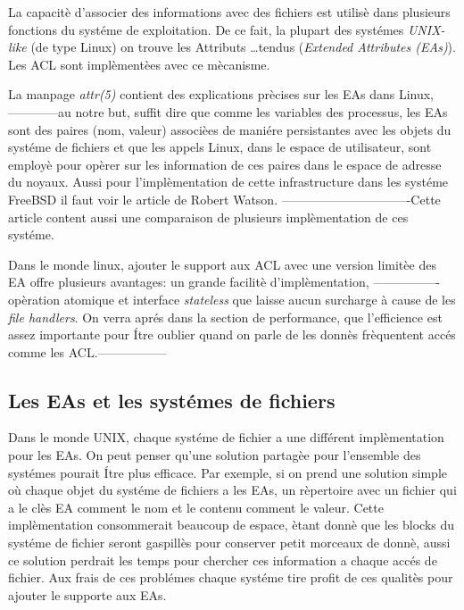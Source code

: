 La capacitè d'associer des informations avec des fichiers est utilisè dans plusieurs fonctions du systéme de exploitation. De ce fait, la plupart des systémes \emph{UNIX-like} (de type Linux) on trouve les Attributs …tendus (\emph{Extended Attributes (EAs)}). Les ACL sont implèmentèes avec ce mècanisme.

La manpage \cite{aclsuse} \emph{attr(5)} contient des explications prècises sur les EAs dans Linux, ------------au notre but, suffit dire que comme les variables des processus, les EAs sont des paires (nom, valeur) associèes de maniére persistantes avec les objets du systéme de fichiers et que les appels Linux, dans le espace de utilisateur, sont employè pour opèrer sur les information de ces paires dans le espace de adresse du noyaux. Aussi pour l'implèmentation de cette infrastructure dans les systéme FreeBSD il faut voir le article de Robert Watson\cite{trust}. -------------------------------Cette article content aussi une comparaison de plusieurs implèmentation de ces systéme.
 
Dans le monde linux, ajouter le support aux ACL avec une version limitèe des EA offre plusieurs avantages: un grande facilitè d'implèmentation, ----------------opèration atomique et interface \emph{stateless} que laisse aucun surcharge à cause de les \emph{file handlers}. On verra aprés dans la section de performance, que l'efficience est assez importante pour Ítre oublier quand on parle de les donnès frèquentent accés comme les ACL.-----------------
 
\subsection{Les EAs et les systémes de fichiers}
 
Dans le monde UNIX, chaque systéme de fichier a une différent implèmentation pour les EAs. On peut penser qu'une solution partagèe pour l'ensemble des systémes pourait Ítre plus efficace. Par exemple, si on prend une solution simple où chaque objet du systéme de fichiers a les EAs, un rèpertoire avec un fichier qui a le clès EA comment le nom et le contenu comment le valeur. Cette implèmentation consommerait beaucoup de espace, ètant donnè que les blocks du systéme de fichier seront gaspillès pour conserver petit morceaux de donnè, aussi ce solution perdrait les temps pour chercher ces information a chaque accés de fichier. Aux frais de ces problémes chaque systéme tire profit de ces qualitès pour ajouter le supporte aux EAs.
 
